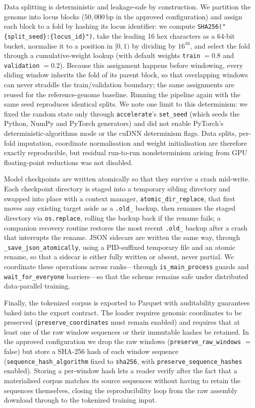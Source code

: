 \documentclass[twocolumn,10pt]{article}
\begin{document}
Data splitting is deterministic and leakage-safe by construction. We partition the genome into locus
blocks (\(50{,}000\,\text{bp}\) in the approved configuration) and assign each block to a fold by
hashing its locus identifier: we compute \texttt{SHA256("\{split\_seed\}:\{locus\_id\}")}, take the
leading 16 hex characters as a 64-bit bucket, normalise it to a position in \([0,1)\) by dividing by
\(16^{16}\), and select the fold through a cumulative-weight lookup (with default weights
\texttt{train} \(=0.8\) and \texttt{validation} \(=0.2\)). Because this assignment happens before
windowing, every sliding window inherits the fold of its parent block, so that overlapping windows
can never straddle the train/validation boundary; the same assignments are reused for the
reference-genome baseline. Running the pipeline again with the same seed reproduces identical
splits. We note one limit to this determinism: we fixed the random state only through
\texttt{accelerate}'s \texttt{set\_seed} (which seeds the Python, NumPy and PyTorch generators) and
did not enable PyTorch's deterministic-algorithms mode or the cuDNN determinism flags. Data splits,
per-fold imputation, coordinate normalisation and weight initialisation are therefore exactly
reproducible, but residual run-to-run nondeterminism arising from GPU floating-point reductions was
not disabled.

Model checkpoints are written atomically so that they survive a crash mid-write. Each checkpoint
directory is staged into a temporary sibling directory and swapped into place with a context
manager, \texttt{atomic\_dir\_replace}, that first moves any existing target aside as a
\texttt{.old\_} backup, then renames the staged directory via \texttt{os.replace}, rolling the
backup back if the rename fails; a companion recovery routine restores the most recent
\texttt{.old\_} backup after a crash that interrupts the rename. JSON sidecars are written the same
way, through \texttt{\_save\_json\_atomically}, using a PID-suffixed temporary file and an atomic
rename, so that a sidecar is either fully written or absent, never partial. We coordinate these
operations across ranks---through \texttt{is\_main\_process} guards and \texttt{wait\_for\_everyone}
barriers---so that the scheme remains safe under distributed data-parallel training.

Finally, the tokenized corpus is exported to Parquet with auditability guarantees baked into the
export contract. The loader requires genomic coordinates to be preserved
(\texttt{preserve\_coordinates} must remain enabled) and requires that at least one of the raw
window sequences or their immutable hashes be retained. In the approved configuration we drop the
raw windows (\texttt{preserve\_raw\_windows} \(=\) false) but store a SHA-256 hash of each window
sequence (\texttt{sequence\_hash\_algorithm} fixed to \texttt{sha256}, with
\texttt{preserve\_sequence\_hashes} enabled). Storing a per-window hash lets a reader verify after
the fact that a materialised corpus matches its source sequences without having to retain the
sequences themselves, closing the reproducibility loop from the raw assembly download through to the
tokenized training input.
\end{document}
